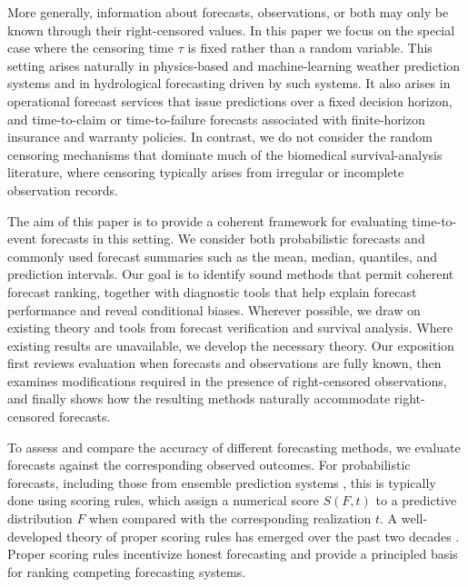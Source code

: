 \documentclass[10pt]{article} %
\theoremstyle{theorem}
\theoremstyle{definition}
\begin{document}
More generally, information about forecasts, observations, or both may only be known through their right-censored values. In this paper we focus on the special case where the censoring time $\tau$ is fixed rather than a random variable. This setting arises naturally in physics-based and machine-learning weather prediction systems and in hydrological forecasting driven by such systems. It also arises in operational forecast services that issue predictions over a fixed decision horizon, and time-to-claim or time-to-failure forecasts associated with finite-horizon insurance and warranty policies. In contrast, we do not consider the random censoring mechanisms that dominate much of the biomedical survival-analysis literature, where censoring typically arises from irregular or incomplete observation records.

The aim of this paper is to provide a coherent framework for evaluating time-to-event forecasts in this setting. We consider both probabilistic forecasts and commonly used forecast summaries such as the mean, median, quantiles, and prediction intervals. Our goal is to identify sound methods that permit coherent forecast ranking, together with diagnostic tools that help explain forecast performance and reveal conditional biases. Wherever possible, we draw on existing theory and tools from forecast verification and survival analysis. Where existing results are unavailable, we develop the necessary theory. Our exposition first reviews evaluation when forecasts and observations are fully known, then examines modifications required in the presence of right-censored observations, and finally shows how the resulting methods naturally accommodate right-censored forecasts.

To assess and compare the accuracy of different forecasting methods, we evaluate forecasts against the corresponding observed outcomes. For probabilistic forecasts, including those from ensemble prediction systems \citep{mureau1993ensemble, molteni1996ecmwf, schaake2007hepex, cloke2009ensemble}, this is typically done using scoring rules, which assign a numerical score $S(F,t)$ to a predictive distribution $F$ when compared with the corresponding realization $t$. A well-developed theory of proper scoring rules has emerged over the past two decades \citep{gneiting2007strictly, gneiting2014probabilistic}. Proper scoring rules incentivize honest forecasting and provide a principled basis for ranking competing forecasting systems.
\end{document}

